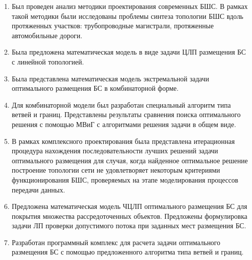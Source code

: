 
\begin{enumerate}
    \item Был проведен анализ методики проектирования современных БШС. В рамках такой методики были исследованы проблемы синтеза топологии БШС вдоль протяженных участков: трубопроводные магистрали, протяженные автомобильные дороги. 
    \item Была предложена математическая модель в виде задачи ЦЛП размещения БС с линейной топологией.
    \item Была представлена математическая модель экстремальной задачи оптимального размещения БС в комбинаторной форме. 
    \item Для комбинаторной модели был разработан специальный алгоритм типа ветвей и границ. Представлены результаты сравнения поиска оптимального решения с помощью МВиГ с алгоритмами решения задачи в общем виде.
    \item В рамках комплексного проектирования была представлена итерационная процедура нахождения последовательности лучших решений задачи оптимального размещения для случая, когда найденное оптимальное решение построение топологии сети не удовлетворяет некоторым критериями функционирования БШС, проверяемых на этапе моделирования процессов передачи данных.
    \item Предложена математическая модель ЧЦЛП оптимального размещения БС для покрытия множества рассредоточенных объектов. Предложены формулировка задачи ЛП проверки допустимого потока при заданных мест размещения БС.
    \item Разработан программный комплекс для расчета задачи оптимального размещения БС  с помощью предложенного алгоритма типа ветвей и границ.
\end{enumerate}




